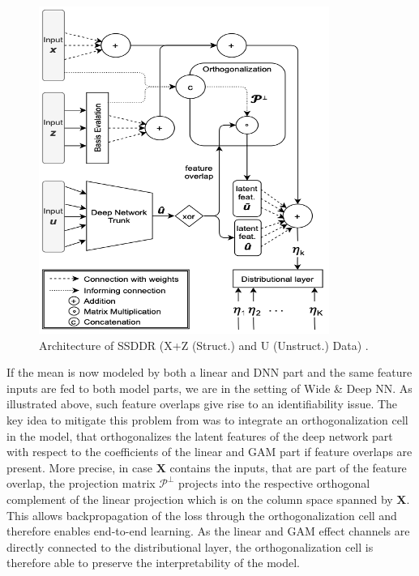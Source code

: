 \documentclass[
]{krantz}
\begin{document}
\begin{figure}

{\centering \includegraphics[width=1\linewidth]{figures/03-02-struc+unstruc-data/SSDDR_Architecture} 

}

\caption{Architecture of SSDDR (X+Z (Struct.) and U (Unstruct.) Data) \citep{SSDDR2020}.}\label{fig:SSDDR}
\end{figure}



If the mean is now modeled by both a linear and DNN part and the same feature inputs are fed to both model parts, we are in the setting of Wide \& Deep NN. As illustrated above, such feature overlaps give rise to an identifiability issue. The key idea to mitigate this problem from \citet{SSDDR2020} was to integrate an orthogonalization cell in the model, that orthogonalizes the latent features of the deep network part with respect to the coefficients of the linear and GAM part if feature overlaps are present. More precise, in case \(\boldsymbol{X}\) contains the inputs, that are part of the feature overlap, the projection matrix \(\boldsymbol{\mathcal{P}^{\perp}}\) projects into the respective orthogonal complement of the linear projection which is on the column space spanned by \(\boldsymbol{X}\). This allows backpropagation of the loss through the orthogonalization cell and therefore enables end-to-end learning. As the linear and GAM effect channels are directly connected to the distributional layer, the orthogonalization cell is therefore able to preserve the interpretability of the model.
\end{document}
